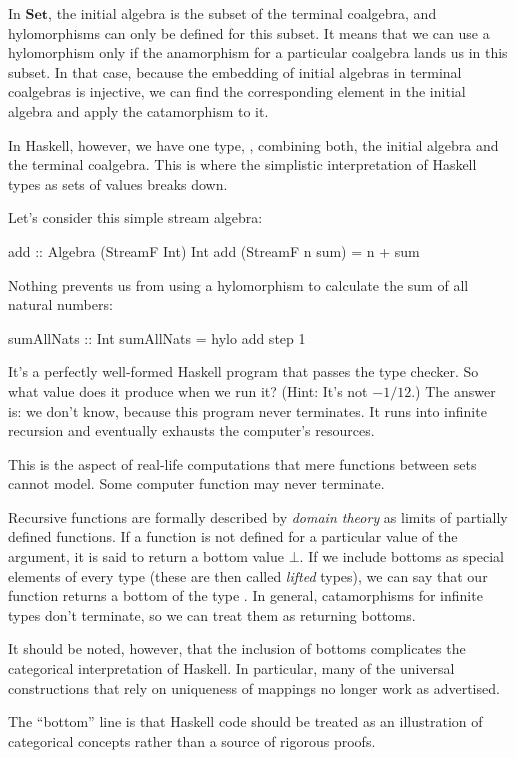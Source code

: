 \documentclass[DaoFP]{subfiles}
\begin{document}
In $\mathbf{Set}$, the initial algebra is the subset of the terminal coalgebra, and hylomorphisms can only be defined for this subset. It means that we can use a hylomorphism only if the anamorphism for a particular coalgebra lands us in this subset. In that case, because the embedding of initial algebras in terminal coalgebras is injective, we can find the corresponding element in the initial algebra and apply the catamorphism to it.

In Haskell, however, we have one type, , combining both, the initial algebra and the terminal coalgebra. This is where the simplistic interpretation of Haskell types as sets of values breaks down. 

Let's consider this simple stream algebra:
\begin{haskell}
add :: Algebra (StreamF Int) Int
add (StreamF n sum) = n + sum
\end{haskell}
Nothing prevents us from using a hylomorphism to calculate the sum of all natural numbers:
\begin{haskell}
sumAllNats :: Int
sumAllNats = hylo add step 1
\end{haskell}
It's a perfectly well-formed Haskell program that passes the type checker. So what value does it produce when we run it? (Hint: It's not $-1/12$.) The answer is: we don't know, because this program never terminates. It runs into infinite recursion and eventually exhausts the computer's resources.

This is the aspect of real-life computations that mere functions between sets cannot model. Some computer function may never terminate. 

Recursive functions are formally described by \emph{domain theory} as limits of partially defined functions. If a function is not defined for a particular value of the argument, it is said to return a bottom value $\bot$. If we include bottoms as special elements of every type (these are then called \emph{lifted} types), we can say that our function  returns a bottom of the type . In general, catamorphisms for infinite types don't terminate, so we can treat them as returning bottoms.

It should be noted, however, that the inclusion of bottoms complicates the categorical interpretation of Haskell. In particular, many of the universal constructions that rely on uniqueness of mappings no longer work as advertised.

The ``bottom'' line is that Haskell code should be treated as an illustration of categorical concepts rather than a source of rigorous proofs.
\end{document}
